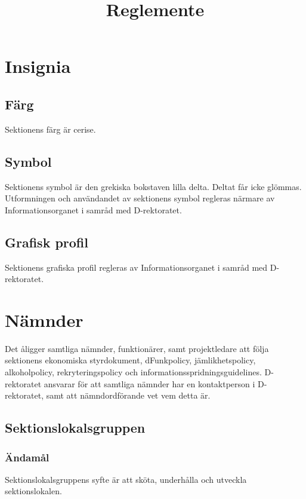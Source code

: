 \documentclass{dgovdoc}
\title{Reglemente}
\begin{document}
\maketitle

\section{Insignia}

\subsection{Färg}

Sektionens färg är cerise.

\subsection{Symbol}

Sektionens symbol är den grekiska bokstaven lilla delta. Deltat får icke
glömmas. Utformningen och användandet av sektionens symbol regleras närmare av
Informationsorganet i samråd med D-rektoratet.

\subsection{Grafisk profil}

Sektionens grafiska profil regleras av Informationsorganet i samråd med
D-rektoratet.

\section{Nämnder}

Det åligger samtliga nämnder, funktionärer, samt projektledare att följa sektionens ekonomiska
styrdokument, dFunkpolicy, jämlikhetspolicy, alkoholpolicy, rekryteringspolicy och
informationsspridningsguidelines. D-rektoratet ansvarar för att samtliga
nämnder har en kontaktperson i D-rektoratet, samt att nämndordförande vet vem
detta är.

\subsection{Sektionslokalsgruppen}

\subsubsection{Ändamål}

Sektionslokalsgruppens syfte är att sköta, underhålla och utveckla
sektionslokalen.
\end{document}
